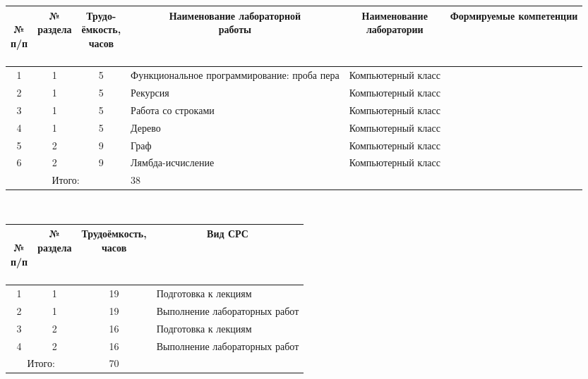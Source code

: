 \begin{center}
\begin{longtable}{|c|c|c|p{}|p{}|c|}\hline
\multicolumn{1}{|c|}{\parbox[c]{0.6cm}{\bfseries~\\№\\п/п\\~}} &
\multicolumn{1}{c|}{\parbox[c]{1.6cm}{\bfseries №\\раздела}} &
\multicolumn{1}{c|}{\parbox[c]{1.8cm}{\bfseries Трудо-\\ёмкость,\\часов}} &
\multicolumn{1}{c|}{\parbox[c]{3.5cm}{\bfseries Наименование лабораторной\\работы}} &
\multicolumn{1}{c|}{\parbox[c]{3cm}{\bfseries Наименование\\лаборатории}} &
\multicolumn{1}{c|}{\parbox{3.1cm}{\bfseries Формируемые компетенции}} \\\hline
1 & 1 & 5 & Функциональное программирование: проба пера & Компьютерный класс & \compone{} \\\hline
2 & 1 & 5 & Рекурсия & Компьютерный класс & \compone{} \\\hline
3 & 1 & 5 & Работа со строками & Компьютерный класс & \compthree{} \\\hline
4 & 1 & 5 & Дерево & Компьютерный класс & \compthree{} \\\hline
5 & 2 & 9 & Граф & Компьютерный класс & \comptwo{} \\\hline
6 & 2 & 9 & Лямбда-исчисление & Компьютерный класс & \comptwo{} \\\hline

\multicolumn{3}{|c|}{Итого:} & 38 & & \\\hline
\end{longtable}
\end{center}


\\

\begin{center}
\begin{longtable}{|c|c|c|p{}|}\hline
\multicolumn{1}{|c|}{\parbox[c]{.6cm}{\bfseries~\\№\\п/п\\~}} &
\multicolumn{1}{c|}{\parbox[c]{1.7cm}{\bfseries №\\раздела}} &
\multicolumn{1}{c|}{\parbox[c]{3.1cm}{\bfseries Трудоёмкость,\\часов}} &
\multicolumn{1}{c|}{\parbox[c]{4cm}{\bfseries Вид СРС}} \\\hline
1 & 1 & 19 & Подготовка к лекциям\\\hline
2 & 1 & 19 & Выполнение лабораторных работ\\\hline
3 & 2 & 16 & Подготовка к лекциям\\\hline
4 & 2 & 16 & Выполнение лабораторных работ\\\hline

\multicolumn{2}{|c|}{Итого:} & 70 & \\\hline
\end{longtable}
\end{center}


